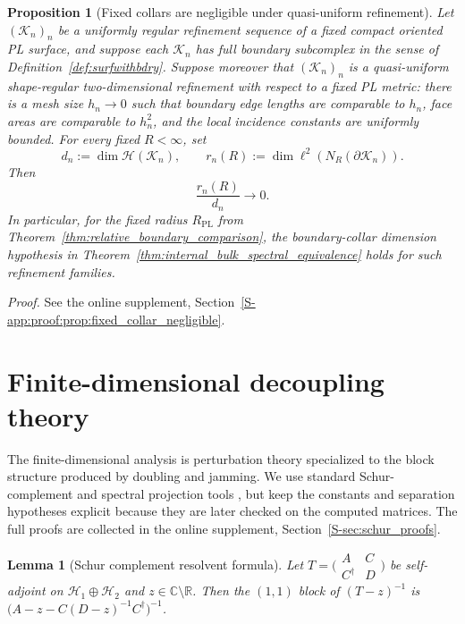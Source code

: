 \documentclass[11pt]{article}
\numberwithin{equation}{section}
\newtheorem{lemma}[theorem]{Lemma}
\newtheorem{proposition}[theorem]{Proposition}
\theoremstyle{definition}
\theoremstyle{remark}
\newcommand{\proofsuppref}[1]{%
  \par\noindent\emph{Proof.} See the online supplement, Section~\ref{S-#1}.\par\medskip
}
\newcommand{\K}{\mathcal{K}}
\newcommand{\Hil}{\mathcal{H}}
\newcommand{\bd}{\partial}
\begin{document}
\begin{proposition}[Fixed collars are negligible under quasi-uniform refinement]\label{prop:fixed_collar_negligible}
Let \((\K_n)_n\) be a uniformly regular refinement sequence of a fixed compact oriented PL
surface, and suppose each \(\K_n\) has full boundary subcomplex in the sense of
Definition~\ref{def:surfwithbdry}. Suppose moreover that \((\K_n)_n\) is a quasi-uniform
shape-regular two-dimensional refinement with respect to a fixed PL metric: there is a mesh size
\(h_n\to0\) such that boundary edge lengths are comparable to \(h_n\), face areas are comparable
to \(h_n^2\), and the local incidence constants are uniformly bounded. For every fixed
\(R<\infty\), set
\[
d_n:=\dim\Hil(\K_n),
\qquad
r_n(R):=\dim \ell^2\!\left(N_R(\bd\K_n)\right).
\]
Then
\[
\frac{r_n(R)}{d_n}\longrightarrow0 .
\]
In particular, for the fixed radius \(R_{\mathrm{PL}}\) from
Theorem~\ref{thm:relative_boundary_comparison}, the boundary-collar dimension hypothesis in
Theorem~\ref{thm:internal_bulk_spectral_equivalence} holds for such refinement families.
\end{proposition}
\proofsuppref{app:proof:prop:fixed_collar_negligible}

\section{Finite-dimensional decoupling theory}\label{sec:decoupling}

The finite-dimensional analysis is perturbation theory specialized to the block structure produced
by doubling and jamming. We use standard Schur-complement and spectral projection tools
\cite[Chapter~II]{KatoPerturbation,BhatiaMatrixAnalysis}, but keep the constants and separation
hypotheses explicit because they are later checked on the computed matrices. The full proofs are
collected in the online supplement, Section~\ref{S-sec:schur_proofs}.

\begin{lemma}[Schur complement resolvent formula]\label{lem:schur}
Let $T=\bigl(\begin{smallmatrix}A&C\\ C^\dagger&D\end{smallmatrix}\bigr)$ be self-adjoint on
$\Hil_1\oplus\Hil_2$ and $z\in\mathbb C\setminus\mathbb R$. Then the $(1,1)$ block of $(T-z)^{-1}$
is $\bigl(A-z-C(D-z)^{-1}C^\dagger\bigr)^{-1}$.
\end{lemma}
\end{document}
